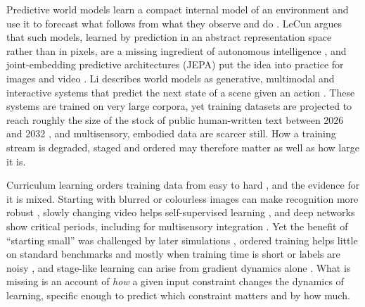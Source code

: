 \documentclass{article}
\theoremstyle{plain}
\theoremstyle{remark}
\begin{document}
Predictive world models learn a compact internal model of an environment and use it to forecast what follows from what they observe and do \autocite{ha2018world}. LeCun argues that such models, learned by prediction in an abstract representation space rather than in pixels, are a missing ingredient of autonomous intelligence \autocite{lecun2022path}, and joint-embedding predictive architectures (JEPA) put the idea into practice for images and video \autocite{assran2023self,bardes2024revisiting,garrido2025intuitive}. Li describes world models as generative, multimodal and interactive systems that predict the next state of a scene given an action \autocite{li2025words}. These systems are trained on very large corpora, yet training datasets are projected to reach roughly the size of the stock of public human-written text between 2026 and 2032 \autocite{villalobos2024will}, and multisensory, embodied data are scarcer still. How a training stream is degraded, staged and ordered may therefore matter as well as how large it is.

Curriculum learning orders training data from easy to hard \autocite{bengio2009curriculum}, and the evidence for it is mixed. Starting with blurred or colourless images can make recognition more robust \autocite{vogelsang2018potential,vogelsang2024impact}, slowly changing video helps self-supervised learning \autocite{sheybani2023curriculum}, and deep networks show critical periods, including for multisensory integration \autocite{achille2019critical,kleinman2023critical}. Yet the benefit of ``starting small'' \autocite{elman1993learning} was challenged by later simulations \autocite{rohde1999language}, ordered training helps little on standard benchmarks and mostly when training time is short or labels are noisy \autocite{wu2021curricula}, and stage-like learning can arise from gradient dynamics alone \autocite{saxe2019mathematical}. What is missing is an account of \emph{how} a given input constraint changes the dynamics of learning, specific enough to predict which constraint matters and by how much.
\end{document}
